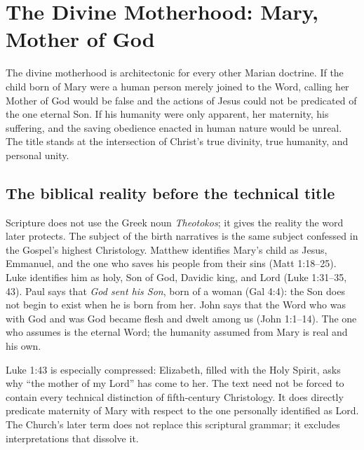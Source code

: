 \section{The Divine Motherhood: Mary, Mother of God}


The divine motherhood is architectonic for every other Marian doctrine. If the child born of Mary were a human person merely joined to the Word, calling her Mother of God would be false and the actions of Jesus could not be predicated of the one eternal Son. If his humanity were only apparent, her maternity, his suffering, and the saving obedience enacted in human nature would be unreal. The title stands at the intersection of Christ's true divinity, true humanity, and personal unity.

\subsection{The biblical reality before the technical title}

Scripture does not use the Greek noun \emph{Theotokos}; it gives the reality the word later protects. The subject of the birth narratives is the same subject confessed in the Gospel's highest Christology. Matthew identifies Mary's child as Jesus, Emmanuel, and the one who saves his people from their sins (Matt 1:18--25). Luke identifies him as holy, Son of God, Davidic king, and Lord (Luke 1:31--35, 43). Paul says that \emph{God sent his Son}, born of a woman (Gal 4:4): the Son does not begin to exist when he is born from her. John says that the Word who was with God and was God became flesh and dwelt among us (John 1:1--14). The one who assumes is the eternal Word; the humanity assumed from Mary is real and his own.

Luke 1:43 is especially compressed: Elizabeth, filled with the Holy Spirit, asks why ``the mother of my Lord'' has come to her. The text need not be forced to contain every technical distinction of fifth-century Christology. It does directly predicate maternity of Mary with respect to the one personally identified as Lord. The Church's later term does not replace this scriptural grammar; it excludes interpretations that dissolve it.

